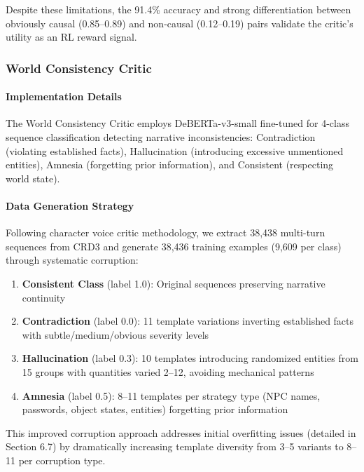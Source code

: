 \documentclass[11pt]{article}
\begin{document}
Despite these limitations, the 91.4\% accuracy and strong differentiation between obviously causal (0.85--0.89) and non-causal (0.12--0.19) pairs validate the critic's utility as an RL reward signal.


\subsubsection{World Consistency Critic}

\paragraph{Implementation Details}
The World Consistency Critic employs DeBERTa-v3-small fine-tuned for 4-class sequence classification detecting narrative inconsistencies: Contradiction (violating established facts), Hallucination (introducing excessive unmentioned entities), Amnesia (forgetting prior information), and Consistent (respecting world state).

\paragraph{Data Generation Strategy}
Following character voice critic methodology, we extract 38,438 multi-turn sequences from CRD3 and generate 38,436 training examples (9,609 per class) through systematic corruption:

\begin{enumerate}
    \item \textbf{Consistent Class} (label 1.0): Original sequences preserving narrative continuity
    \item \textbf{Contradiction} (label 0.0): 11 template variations inverting established facts with subtle/medium/obvious severity levels
    \item \textbf{Hallucination} (label 0.3): 10 templates introducing randomized entities from 15 groups with quantities varied 2--12, avoiding mechanical patterns
    \item \textbf{Amnesia} (label 0.5): 8--11 templates per strategy type (NPC names, passwords, object states, entities) forgetting prior information
\end{enumerate}

This improved corruption approach addresses initial overfitting issues (detailed in Section 6.7) by dramatically increasing template diversity from 3--5 variants to 8--11 per corruption type.
\end{document}
